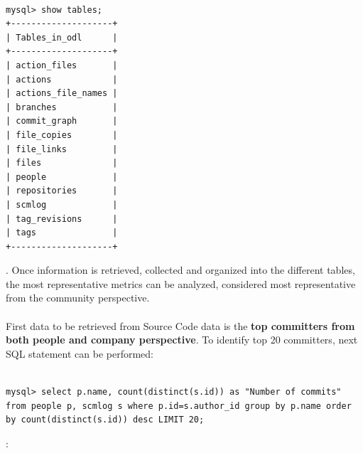 \documentclass[a4paper, 12pt]{book}
\begin{document}
\begin{verbatim}

mysql> show tables;
+--------------------+
| Tables_in_odl      |
+--------------------+
| action_files       |
| actions            |
| actions_file_names |
| branches           |
| commit_graph       |
| file_copies        |
| file_links         |
| files              |
| people             |
| repositories       |
| scmlog             |
| tag_revisions      |
| tags               |
+--------------------+

\end{verbatim}
. Once information is retrieved, collected and organized into the different tables, the most representative metrics can be analyzed, considered most representative from the community perspective.\\
\\
First data to be retrieved from Source Code data is the \textbf{top committers from both people and company perspective}. To identify top 20 committers, next SQL statement can be performed:
\begin{verbatim}

mysql> select p.name, count(distinct(s.id)) as "Number of commits"
from people p, scmlog s where p.id=s.author_id group by p.name order
by count(distinct(s.id)) desc LIMIT 20;

\end{verbatim}
:
\end{document}
